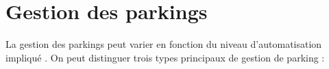     




\section{Gestion des parkings}

La gestion des parkings peut varier en fonction du niveau d'automatisation impliqué \cite{bensalah-master}. On peut distinguer trois types principaux de gestion de parking :

